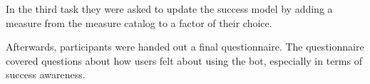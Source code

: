 In the third task they were asked to update the success model by adding a measure from the measure catalog to a factor of their choice. 

Afterwards, participants were handed out a final questionnaire.
The questionnaire covered questions about how users felt about using the bot, especially in terms of success awareness.

